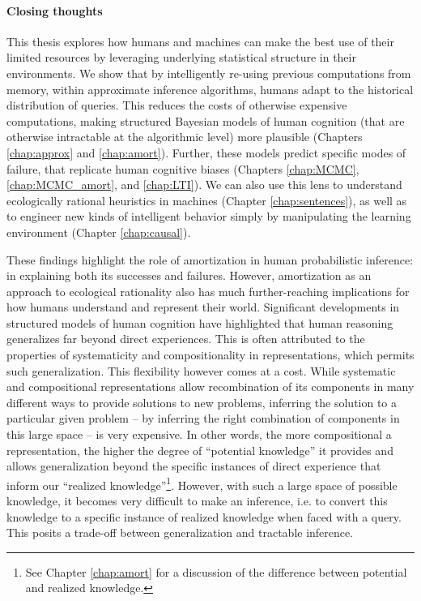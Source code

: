 \paragraph{Closing thoughts}
This thesis explores how humans and machines can make the best use of their limited resources by leveraging underlying statistical structure in their environments. We show that by intelligently re-using previous computations from memory, within approximate inference algorithms, humans adapt to the historical distribution of queries. This reduces the costs of otherwise expensive computations, making structured Bayesian models of human cognition (that are otherwise intractable at the algorithmic level) more plausible (Chapters \ref{chap:approx} and \ref{chap:amort}). Further, these models predict specific modes of failure, that replicate human cognitive biases (Chapters \ref{chap:MCMC}, \ref{chap:MCMC_amort}, and \ref{chap:LTI}). We can also use this lens to understand ecologically rational heuristics in machines (Chapter \ref{chap:sentences}), as well as to engineer new kinds of intelligent behavior simply by manipulating the learning environment (Chapter \ref{chap:causal}).

These findings highlight the role of amortization in human probabilistic inference: in explaining both its successes and failures. However, amortization as an approach to ecological rationality also has much further-reaching implications for how humans understand and represent their world. Significant developments in structured models of human cognition have highlighted that human reasoning generalizes far beyond direct experiences\citep{griffiths2006, shepard1987toward, wu2018generalization, schulz2017compositional}. This is often attributed to the properties of systematicity and compositionality\citep{fodor88} in representations, which permits such generalization. This flexibility however comes at a cost. While systematic and compositional representations allow recombination of its components in many different ways to provide solutions to new problems, inferring the solution to a particular given problem – by inferring the right combination of components in this large space – is very expensive. In other words, the more compositional a representation, the higher the degree of ``potential knowledge'' it provides and allows generalization beyond the specific instances of direct experience that inform our ``realized knowledge''\footnote{See Chapter \ref{chap:amort} for a discussion of the difference between potential and realized knowledge.}. However, with such a large space of possible knowledge, it becomes very difficult to make an inference, i.e. to convert this knowledge to a specific instance of realized knowledge when faced with a query. This posits a trade-off between generalization and tractable inference\citep{mitchell1980need}. 

